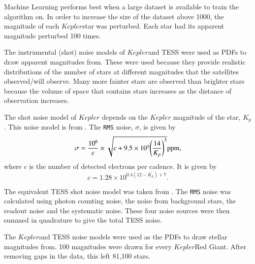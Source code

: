 \documentclass[a4paper,fleqn,usenatbib,useAMS]{mnras}
\newcommand{\kep}{\ensuremath{Kepler}\:}
\begin{document}
Machine Learning performs best when a large dataset is available to train the algorithm on. In order to increase the size of the dataset above 1000, the magnitude of each \kep star was perturbed. Each star had its apparent magnitude perturbed 100 times. 

The instrumental (shot) noise models of \kep and TESS were used as PDFs to draw apparent magnitudes from. These were used because they provide realistic distributions of the number of stars at different magnitudes that the satellites observed/will observe. Many more fainter stars are observed than brighter stars because the volume of space that contains stars increases as the distance of observation increases.

The shot noise model of $Kepler$ depends on the $Kepler$ magnitude of the star, $K_{p}$. This noise model is from \citet{gilliland_initial_2010}. The \texttt{RMS} noise, $\sigma$, is given by
\begin{equation}
\sigma = \frac{10^{6}}{c} \times \sqrt{c+9.5 \times 10^{5}\Bigg(\frac{14}{K_{p}}\Bigg)^{5}}  {\rm ppm},
\label{eq:kep noise}
\end{equation}
where $c$ is the number of detected electrons per cadence. It is given by
\begin{equation}
c = 1.28 \times 10^{0.4(12-K_{p})+7} .
\end{equation}

The equivalent TESS shot noise model was taken from \citet{sullivan_transiting_2015}. The \texttt{RMS} noise was calculated using photon counting noise, the noise from background stars, the readout noise and the systematic noise. These four noise sources were then summed in quadrature to give the total TESS noise.

The \kep and TESS noise models were used as the PDFs to draw stellar magnitudes from. 100 magnitudes were drawn for every \kep Red Giant. After removing gaps in the data, this left 81,100 stars.
\end{document}

